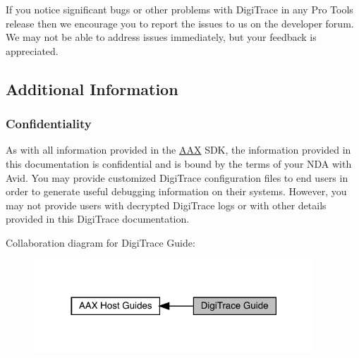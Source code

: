  If you notice significant bugs or other problems with Digi\+Trace in any Pro Tools release then we encourage you to report the issues to us on the developer forum. We may not be able to address issues immediately, but your feedback is appreciated.

\hypertarget{a00834_digitrace__additionalinformation}{}\subsection{Additional Information}\label{a00834_digitrace__additionalinformation}
\hypertarget{a00834_digitrace__additionalinformation__confidentiality}{}\subsubsection{Confidentiality}\label{a00834_digitrace__additionalinformation__confidentiality}
 As with all information provided in the \mbox{\hyperlink{a00852}{A\+AX}} S\+DK, the information provided in this documentation is confidential and is bound by the terms of your N\+DA with Avid. You may provide customized Digi\+Trace configuration files to end users in order to generate useful debugging information on their systems. However, you may not provide users with decrypted Digi\+Trace logs or with other details provided in this Digi\+Trace documentation.

 Collaboration diagram for Digi\+Trace Guide\+:
\nopagebreak
\begin{figure}[H]
\begin{center}
\leavevmode
\includegraphics[width=298pt]{a00834}
\end{center}
\end{figure}

